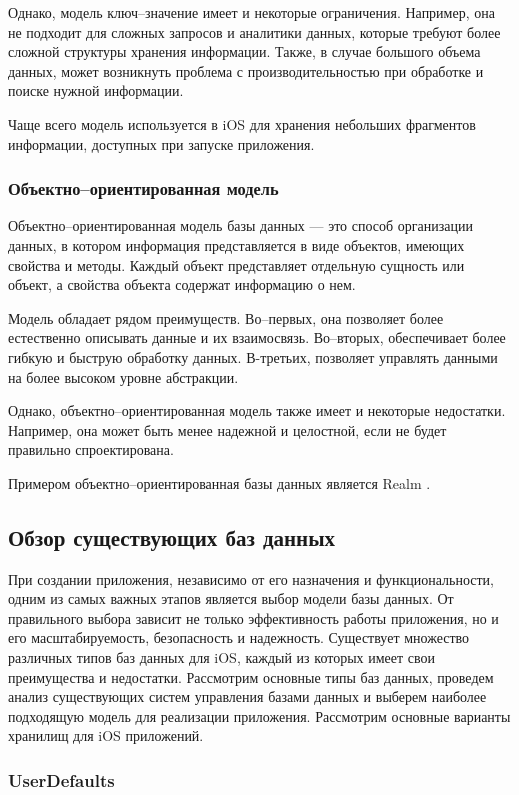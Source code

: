 Однако, модель ключ--значение имеет и некоторые ограничения. Например, она не подходит для сложных запросов и аналитики данных, которые требуют более сложной структуры хранения информации. Также, в случае большого объема данных, может возникнуть проблема с производительностью при обработке и поиске нужной информации.

Чаще всего модель используется в iOS для хранения небольших фрагментов информации, доступных при запуске приложения. 

\subsubsection{Объектно--ориентированная модель}
Объектно--ориентированная модель базы данных --- это способ организации данных, в котором информация представляется в виде объектов, имеющих свойства и методы. Каждый объект представляет отдельную сущность или объект, а свойства объекта содержат информацию о нем.

Модель обладает рядом преимуществ. Во--первых, она позволяет более естественно описывать данные и их взаимосвязь. Во--вторых, обеспечивает более гибкую и быструю обработку данных. В-третьих, позволяет управлять данными на более высоком уровне абстракции.

Однако, объектно--ориентированная модель также имеет и некоторые недостатки. Например, она может быть менее надежной и целостной, если не будет правильно спроектирована.

Примером объектно--ориентированная базы данных является Realm \cite{realm}.

\subsection{Обзор существующих баз данных}

При создании приложения, независимо от его назначения и функциональности, одним из самых важных этапов является выбор модели базы данных. От правильного выбора зависит не только эффективность работы приложения, но и его масштабируемость, безопасность и надежность. Существует множество различных типов баз данных для iOS, каждый из которых имеет свои преимущества и недостатки. Рассмотрим основные типы баз данных, проведем анализ существующих систем управления базами данных и выберем наиболее подходящую модель для реализации приложения. Рассмотрим основные варианты хранилищ для iOS приложений. 

\subsubsection{UserDefaults}

